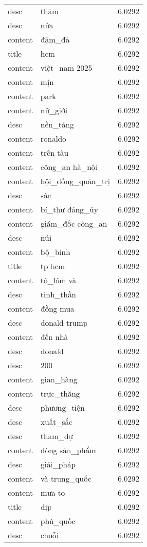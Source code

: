 \documentclass{article}
\begin{document}
\begin{tabular}{lll}
desc & thăm & 6.0292\\
desc & nửa & 6.0292\\
content & đậm\_đà & 6.0292\\
title & hcm & 6.0292\\
content & việt\_nam 2025 & 6.0292\\
content & mịn & 6.0292\\
content & park & 6.0292\\
content & nữ\_giới & 6.0292\\
desc & nền\_tảng & 6.0292\\
content & ronaldo & 6.0292\\
content & trên tàu & 6.0292\\
content & công\_an hà\_nội & 6.0292\\
content & hội\_đồng\_quản\_trị & 6.0292\\
desc & sân & 6.0292\\
content & bí\_thư đảng\_ủy & 6.0292\\
content & giám\_đốc công\_an & 6.0292\\
desc & núi & 6.0292\\
content & bộ\_binh & 6.0292\\
title & tp hcm & 6.0292\\
content & tô\_lâm và & 6.0292\\
desc & tinh\_thần & 6.0292\\
content & đồng mua & 6.0292\\
desc & donald trump & 6.0292\\
content & đến nhà & 6.0292\\
desc & donald & 6.0292\\
desc & 200 & 6.0292\\
content & gian\_hàng & 6.0292\\
content & trực\_thăng & 6.0292\\
desc & phương\_tiện & 6.0292\\
desc & xuất\_sắc & 6.0292\\
desc & tham\_dự & 6.0292\\
content & dòng sản\_phẩm & 6.0292\\
desc & giải\_pháp & 6.0292\\
content & và trung\_quốc & 6.0292\\
content & mưa to & 6.0292\\
title & dịp & 6.0292\\
content & phú\_quốc & 6.0292\\
desc & chuỗi & 6.0292\\

\end{tabular}
\end{document}
